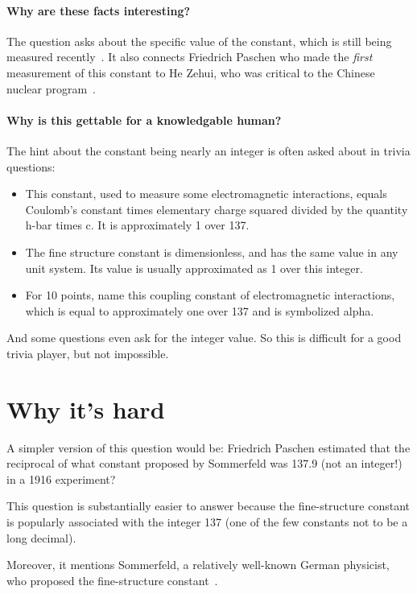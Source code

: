 \documentclass{article}
\begin{document}
\paragraph{Why are these facts interesting?}
The question asks about the specific value of the constant, which is
still being measured recently~\citep{kleppner-06}.  It also connects
Friedrich Paschen who made the \emph{first} measurement of this
constant to He Zehui, who was critical to the Chinese nuclear
program~\citep{lewis-91}.

\paragraph{Why is this gettable for a knowledgable human?}
The hint about the constant being nearly an integer is often asked
about in trivia questions:
\begin{itemize}
  \item This constant, used to measure some electromagnetic interactions, equals Coulomb’s
constant times elementary charge squared divided by the quantity h-bar times c. It is
approximately 1 over 137.
\item The fine structure constant is dimensionless, and has the same value in any unit system. Its value is usually
  approximated as 1 over this integer.
  \item For 10 points, name this coupling
constant of electromagnetic interactions, which is equal to approximately one over 137 and is symbolized
alpha.
\end{itemize}
And some questions even ask for the integer value.  So this is
difficult for a good trivia player, but not impossible.

\section{Why it's hard}

A simpler version of this question would be: Friedrich Paschen
estimated that the reciprocal of what constant proposed by Sommerfeld
was 137.9 (not an integer!) in a 1916 experiment?

This question is substantially easier to answer because the
fine-structure constant is popularly associated with the integer 137
(one of the few constants not to be a long decimal).

Moreover, it mentions Sommerfeld, a relatively well-known German
physicist, who proposed the fine-structure
constant~\citep{sommerfeld-16}.
\end{document}

